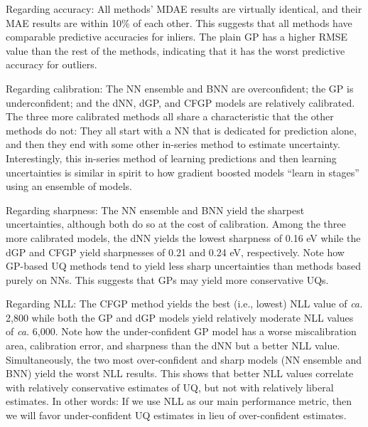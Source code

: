 \documentclass[]{achemso}
\begin{document}
Regarding accuracy:  All methods' \gls{MDAE} results are virtually identical, and their \gls{MAE} results are within 10\% of each other.
This suggests that all methods have comparable predictive accuracies for inliers.
The plain \gls{GP} has a higher \gls{RMSE} value than the rest of the methods, indicating that it has the worst predictive accuracy for outliers.

Regarding calibration:  The \gls{NN} ensemble and \gls{BNN} are overconfident; the \gls{GP} is underconfident; and the \gls{dNN}, \gls{dGP}, and \gls{CFGP} models are relatively calibrated.
The three more calibrated methods all share a characteristic that the other methods do not:  They all start with a \gls{NN} that is dedicated for prediction alone, and then they end with some other in-series method to estimate uncertainty.
Interestingly, this in-series method of learning predictions and then learning uncertainties is similar in spirit to how gradient boosted models ``learn in stages'' using an ensemble of models.

Regarding sharpness:  The \gls{NN} ensemble and \gls{BNN} yield the sharpest uncertainties, although both do so at the cost of calibration.
Among the three more calibrated models, the \gls{dNN} yields the lowest sharpness of 0.16 eV while the \gls{dGP} and \gls{CFGP} yield sharpnesses of 0.21 and 0.24 eV, respectively.
Note how \gls{GP}-based \gls{UQ} methods tend to yield less sharp uncertainties than methods based purely on \gls{NN}s.
This suggests that \gls{GP}s may yield more conservative \gls{UQ}s.

Regarding \gls{NLL}:  The \gls{CFGP} method yields the best (i.e., lowest) \gls{NLL} value of \textit{ca.} 2,800 while both the \gls{GP} and \gls{dGP} models yield relatively moderate \gls{NLL} values of \textit{ca.} 6,000.
Note how the under-confident \gls{GP} model has a worse miscalibration area, calibration error, and sharpness than the \gls{dNN} but a better \gls{NLL} value.
Simultaneously, the two most over-confident and sharp models (\gls{NN} ensemble and \gls{BNN}) yield the worst \gls{NLL} results.
This shows that better \gls{NLL} values correlate with relatively conservative estimates of \gls{UQ}, but not with relatively liberal estimates.
In other words:  If we use \gls{NLL} as our main performance metric, then we will favor under-confident \gls{UQ} estimates in lieu of over-confident estimates.
\end{document}

